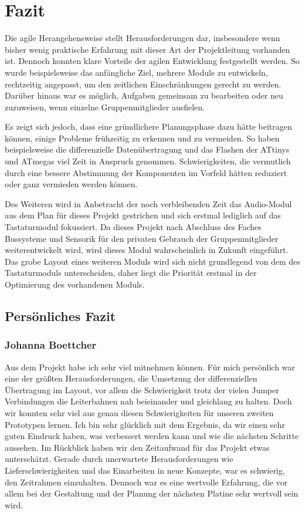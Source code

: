 \section{Fazit}
Die agile Herangehensweise stellt  Herausforderungen dar, insbesondere wenn bisher wenig praktische Erfahrung mit dieser Art der Projektleitung vorhanden ist. Dennoch konnten klare Vorteile der agilen Entwicklung festgestellt werden. So wurde beispielsweise das anfängliche Ziel, mehrere Module zu entwickeln, rechtzeitig angepasst, um den zeitlichen Einschränkungen gerecht zu werden. Darüber hinaus war es möglich, Aufgaben gemeinsam zu bearbeiten oder neu zuzuweisen, wenn einzelne Gruppenmitglieder ausfielen.

Es zeigt sich jedoch, dass eine gründlichere Planungsphase dazu hätte beitragen können, einige Probleme frühzeitig zu erkennen und zu vermeiden. So haben beispielsweise die differenzielle Datenübertragung und das Flashen der ATtinys und ATmegas viel Zeit in Anspruch genommen. Schwierigkeiten, die vermutlich durch eine bessere Abstimmung der Komponenten im Vorfeld hätten reduziert oder ganz vermieden werden können.

Des Weiteren wird in Anbetracht der noch verbleibenden Zeit das Audio-Modul aus dem Plan für dieses Projekt gestrichen und sich erstmal lediglich auf das Tastaturmodul fokussiert. Da dieses Projekt nach Abschluss des Faches \glqq Bussysteme und Sensorik\grqq{} für den privaten Gebrauch der Gruppenmitglieder weiterentwickelt wird, wird dieses Modul wahrscheinlich in Zukunft eingeführt. Das grobe Layout eines weiteren Moduls wird sich nicht grundlegend von dem des Tastaturmoduls unterscheiden, daher liegt die Priorität erstmal in der Optimierung des vorhandenen Moduls.

\newpage
\subsection{Persönliches Fazit}
\subsubsection{Johanna Boettcher}
Aus dem Projekt habe ich sehr viel mitnehmen können. Für mich persönlich war eine der größten Herausforderungen, die Umsetzung der differenziellen Übertragung im Layout, vor allem die Schwierigkeit trotz der vielen Jumper Verbindungen die Leiterbahnen nah beieinander und gleichlang zu halten. Doch wir konnten sehr viel aus genau diesen Schwierigkeiten für unseren zweiten Prototypen lernen. Ich bin sehr glücklich mit dem Ergebnis, da wir einen sehr guten Eindruck haben, was verbessert werden kann und wie die nächsten Schritte aussehen. 
\newline
Im Rückblick haben wir den Zeitaufwand für das Projekt etwas unterschätzt. Gerade durch unerwartete Herausforderungen wie Lieferschwierigkeiten und das Einarbeiten in neue Konzepte, war es schwierig, den Zeitrahmen einzuhalten. Dennoch war es eine wertvolle Erfahrung, die vor allem bei der Gestaltung und der Planung der nächsten Platine sehr wertvoll sein wird.

